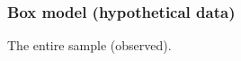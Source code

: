 \documentclass[handout]{beamer}
\begin{document}


   \begin{frame}
   \frametitle{Box model (hypothetical data)}
   \begin{center}
   \end{center}
   The entire sample (observed).
   \end{frame}

\end{document}
